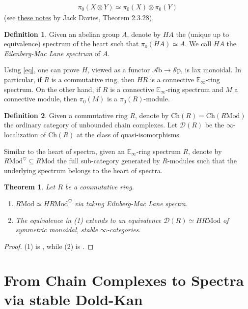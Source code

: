 \documentclass[10pt]{amsart}
\newcommand{\D}{\mathscr{D}}
\newcommand{\bE}{\mathbb{E}}
\newcommand{\Sp}{\mathscr{S}\mathrm{p}}
\newcommand{\Ch}{\mathrm{Ch}}
\newcommand{\Mod}{\mathrm{Mod}}
\newcommand{\Ab}{\mathscr{A}\mathrm{b}}
\newtheorem{theorem}{Theorem}
\theoremstyle{definition}
\newtheorem{definition}{Definition}
\theoremstyle{remark}
\begin{document}
\begin{align}\label{eq}
  \pi_0(X\otimes Y)\simeq\pi_0(X)\otimes\pi_0(Y)
\end{align}
(see \hyperlink{https://www.dropbox.com/scl/fi/j73uavecb4gxkmb6uk80b/ATII_script.pdf?rlkey=2v7ezb2ie3bmu8rlig3kwq7qa&e=1&st=pu7m5wgm&dl=0}{these notes} by Jack Davies, Theorem 2.3.28).
\begin{definition}Given an abelian group $A$, denote by $HA$ the (unique up to equivalence) spectrum of the heart such that $\pi_0(HA)\simeq A$. We call $HA$ the \emph{Eilenberg-Mac Lane spectrum} of $A$.
\end{definition}
Using \cref{eq}, one can prove $H$, viewed as a functor $\Ab\to\Sp$, is lax monoidal. In particular, if $R$ is a commutative ring, then $HR$ is a connective $\bE_\infty$-ring spectrum. On the other hand, if $R$ is a connective $\bE_\infty$-ring spectrum and $M$ a connective module, then $\pi_0(M)$ is a $\pi_0(R)$-module. 
\begin{definition}
  Given a commutative ring $R$, denote by $\Ch(R)=\Ch(R\Mod)$ the ordinary category of unbounded chain complexes. Let $\D(R)$ be the $\infty$-localization of $\Ch(R)$ at the class of quasi-isomorphisms.  
\end{definition} 
Similar to the heart of spectra, given an $\bE_\infty$-ring spectrum $R$, denote by $R\Mod^\heartsuit\subseteq R\Mod$ the full sub-category generated by $R$-modules such that the underlying spectrum belongs to the heart of spectra. 
\begin{theorem}\label{stable}
  Let $R$ be a commutative ring. 
  \begin{enumerate}
    \item $R\Mod\simeq HR\Mod^\heartsuit$ via taking Eilnberg-Mac Lane spectra.
    \item The equivalence in (1) extends to an equivalence $\D(R)\simeq HR\Mod$ of symmetric monoidal, stable $\infty$-categories.
  \end{enumerate} 
\end{theorem}

\begin{proof}
  (1) is \cite[Proposition 7.1.1.13]{lurie2017ha}, while (2) is \cite[Theorem 7.1.2.13]{lurie2017ha}.
\end{proof}


\section{From Chain Complexes to Spectra via stable Dold-Kan}
\end{document}
